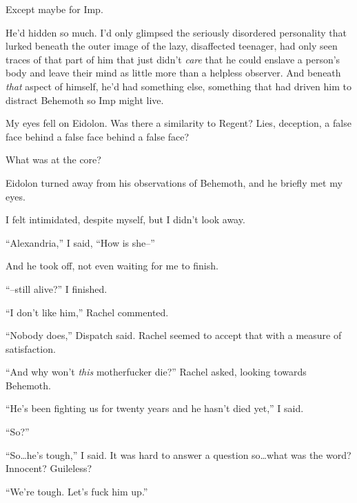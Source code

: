 Except maybe for Imp.



He'd hidden so much.  I'd only glimpsed the seriously disordered personality that lurked beneath the outer image of the lazy, disaffected teenager, had only seen traces of that part of him that just didn't \emph{care} that he could enslave a person's body and leave their mind as little more than a helpless observer.  And beneath \emph{that }aspect of himself, he'd had something else, something that had driven him to distract Behemoth so Imp might live.



My eyes fell on Eidolon.  Was there a similarity to Regent?  Lies, deception, a false face behind a false face behind a false face?



What was at the core?



Eidolon turned away from his observations of Behemoth, and he briefly met my eyes.



I felt intimidated, despite myself, but I didn't look away.



``Alexandria,'' I said, ``How is she--''



And he took off, not even waiting for me to finish.



``--still alive?'' I finished.



``I don't like him,'' Rachel commented.



``Nobody does,'' Dispatch said.  Rachel seemed to accept that with a measure of satisfaction.



``And why won't \emph{this} motherfucker die?'' Rachel asked, looking towards Behemoth.



``He's been fighting us for twenty years and he hasn't died yet,'' I said.



``So?''



``So\ldots he's tough,'' I said.  It was hard to answer a question so\ldots what was the word?  Innocent?  Guileless?



``We're tough.  Let's fuck him up.''



